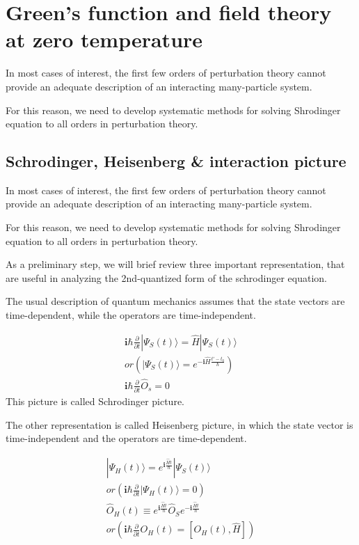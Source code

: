 \chapter{Green's function and field theory at zero temperature}
In most cases of interest, the first few orders of perturbation theory cannot provide an adequate description of an interacting many-particle system.

 For this reason, we need to develop systematic methods for solving Shrodinger equation to all orders in perturbation theory.

\section{Schrodinger, Heisenberg \& interaction picture}

In most cases of interest, the first few orders of perturbation theory cannot provide an adequate description of an interacting many-particle system.

 For this reason, we need to develop systematic methods for solving Shrodinger equation to all orders in perturbation theory.


As a preliminary step, we will brief review three important representation, that are useful in analyzing the 2nd-quantized form of the schrodinger equation.

 The usual description of quantum mechanics assumes that the state vectors are time-dependent, while the operators are time-independent.

\begin{align}
\bm{i} \hbar \frac{\partial}{\partial t} | \Psi_S(t)\rangle=\hat{H}| \Psi_S(t)\rangle \nonumber \\
or\left(| \Psi_S(t)\rangle=e^{-\bm{i}\hat H \frac{t'-t_0}{\hbar}}\right) \nonumber \\
\bm{i} \hbar \frac{\partial}{\partial t} \hat O_s = 0 \nonumber
\end{align}
 This picture is called Schrodinger picture.

 The other representation is called Heisenberg picture, in which the state vector is time-independent and the operators are time-dependent.

\begin{align}
| \Psi_H(t)\rangle=e^{\bm{i}  \frac{\hat Ht}{\hbar}}| \Psi_S(t)\rangle  \\
or\left( \bm{i} \hbar \frac{\partial}{\partial t}| \Psi_H(t)\rangle=0\right) \nonumber \\
\hat O_H(t) \equiv e^{\bm{i}  \frac{\hat Ht}{\hbar}}\hat O_S e^{-\bm{i}  \frac{\hat Ht}{\hbar}} \\
or \left( \bm{i} \hbar \frac{\partial}{\partial t}  O_H(t)=[ O_H(t), \hat H] \right)\nonumber
\end{align}

